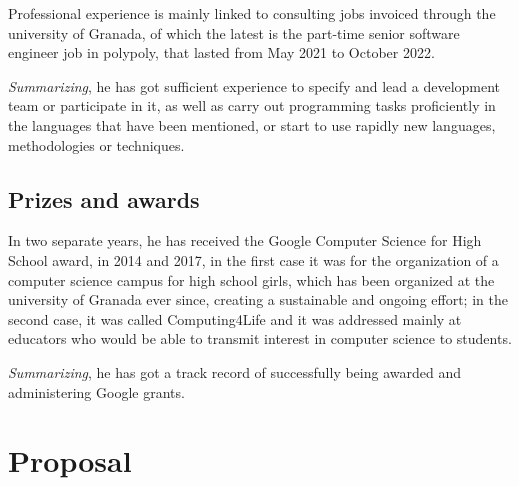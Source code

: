 \documentclass[a4paper]{article}
\begin{document}
Professional experience is mainly linked to consulting jobs invoiced through the
university of Granada, of which the latest is the part-time senior software
engineer job in polypoly, that lasted from May 2021 to October 2022.

{\em Summarizing}, he has got sufficient experience to specify and lead a development
team or participate in it, as well as carry out programming tasks proficiently
in the languages that have been mentioned, or start to use rapidly new
languages, methodologies or techniques.

\subsection{Prizes and awards}

In two separate years, he has received the Google Computer Science for High
School award, in 2014 and 2017, in the first case it was for the organization of
a computer science campus for high school girls, which has been organized at the
university of Granada ever since, creating a sustainable and ongoing effort; in
the second case, it was called Computing4Life and it was addressed mainly at
educators who would be able to transmit interest in computer science to
students.

{\em Summarizing}, he has got a track record of successfully being awarded and
administering Google grants.

\newpage

\section{Proposal}



\end{document}
